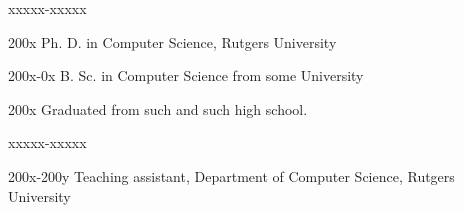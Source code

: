 \documentclass{ruthesis}
\begin{document}
\begin{vita}
 \vspace{15pt}
\begin{descriptionlist}{xxxxx-xxxxx} %
\item[200x] Ph. D. in Computer Science, Rutgers University
\item[200x-0x] B. Sc. in Computer Science from some University
\item[200x] Graduated from such and such high school.
\end{descriptionlist}
\medskip
\begin{descriptionlist}{xxxxx-xxxxx} %
\item[200x-200y] Teaching assistant, Department of Computer Science, Rutgers University
\end{descriptionlist}
\end{vita}



\end{document}
